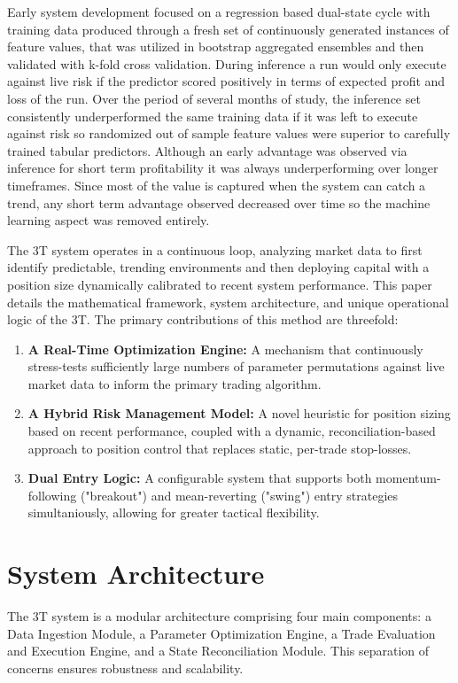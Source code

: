 \documentclass[10pt]{article}
\begin{document}
Early system development focused on a regression based dual-state cycle with training data produced through a fresh set of continuously generated instances of feature values, that was utilized in bootstrap aggregated ensembles and then validated with k-fold cross validation. During inference a run would only execute against live risk if the predictor scored positively in terms of expected profit and loss of the run. Over the period of several months of study, the inference set consistently underperformed the same training data if it was left to execute against risk so randomized out of sample feature values were superior to carefully trained tabular predictors. Although an early advantage was observed via inference for short term profitability it was always underperforming over longer timeframes. Since most of the value is captured when the system can catch a trend, any short term advantage observed decreased over time so the machine learning aspect was removed entirely. 

The 3T system operates in a continuous loop, analyzing market data to first identify predictable, trending environments and then deploying capital with a position size dynamically calibrated to recent system performance. This paper details the mathematical framework, system architecture, and unique operational logic of the 3T. The primary contributions of this method are threefold:
\begin{enumerate}
    \item \textbf{A Real-Time Optimization Engine:} A mechanism that continuously stress-tests sufficiently large numbers of parameter permutations against live market data to inform the primary trading algorithm.
    \item \textbf{A Hybrid Risk Management Model:} A novel heuristic for position sizing based on recent performance, coupled with a dynamic, reconciliation-based approach to position control that replaces static, per-trade stop-losses.
    \item \textbf{Dual Entry Logic:} A configurable system that supports both momentum-following ("breakout")\cite{lefevre1923} and mean-reverting ("swing")\cite{taylor1950} entry strategies simultaniously, allowing for greater tactical flexibility.
\end{enumerate}

\section{System Architecture}
The 3T system is a modular architecture comprising four main components: a Data Ingestion Module, a Parameter Optimization Engine, a Trade Evaluation and Execution Engine, and a State Reconciliation Module. This separation of concerns ensures robustness and scalability.
\end{document}
